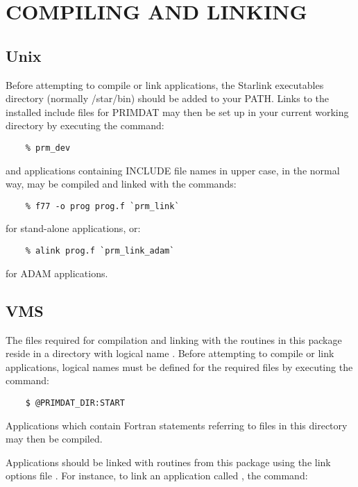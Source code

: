 \newpage
\section{COMPILING AND LINKING}

\subsection{Unix}
\label{compunix}
Before attempting to compile or link applications, the Starlink
executables directory (normally /star/bin) should be added to your PATH.
Links to the installed include files for PRIMDAT may then be set up
in your current working directory by executing the command:

\begin{verbatim}
    % prm_dev
\end{verbatim}

and applications containing INCLUDE file names in upper case, in the normal way,
may be compiled and linked with the commands:

\begin{verbatim}
    % f77 -o prog prog.f `prm_link`
\end{verbatim}

for stand-alone applications, or:

\begin{verbatim}
    % alink prog.f `prm_link_adam`
\end{verbatim}

for ADAM applications.

\subsection{VMS}
The files required for compilation and linking with the routines in this
package reside in a directory with logical name .
Before attempting to compile or link applications, logical names must be
defined for the required files by executing the  command:

\begin{verbatim}
    $ @PRIMDAT_DIR:START
\end{verbatim}

Applications which contain Fortran  statements referring to
files in this directory may then be compiled.

Applications should be linked with routines from this package using the link
options file .
For instance, to link an application called , the 
command:

